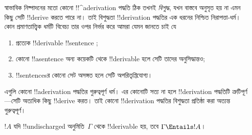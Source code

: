 \documentclass[../../../include/open-logic-section]{subfiles}
\begin{document}
      {}
      {}


\begin{explain}
স্বাভাবিক নিষ্পাদনের মতো কোনো !!^a{derivation} পদ্ধতি ঠিক তখনই
\emph{বিশুদ্ধ}, যখন বাস্তবে অনুসৃত হয় না এমন কিছু সেটি !!{derive}
করতে পারে না। তাই বিশুদ্ধতা !!{derivation} পদ্ধতির এক ধরনের নিশ্চিত
নিরাপত্তা-ধর্ম। কোন প্রমাণতাত্ত্বিক ধর্মটি বিবেচ্য তার ওপর নির্ভর করে
আমরা যেমন জানতে চাই যে
\begin{enumerate}
\item প্রত্যেক !!{derivable} !!{sentence} ;
\item কোনো !!a{sentence} অন্য কয়েকটি থেকে !!{derivable} হলে সেটি
  তাদের অনুসিদ্ধান্তও;
\item !!{sentence}sর কোনো সেট অসঙ্গত হলে সেটি অপরিতৃপ্তিযোগ্য।
\end{enumerate}
এগুলি কোনো !!a{derivation} পদ্ধতির গুরুত্বপূর্ণ ধর্ম। এর কোনোটি সত্য
না হলে !!{derivation} পদ্ধতিটি ত্রুটিপূর্ণ—সেটি অত্যধিক কিছু
!!{derive} করত। তাই কোনো !!{derivation} পদ্ধতির বিশুদ্ধতা প্রতিষ্ঠা
করা অত্যন্ত গুরুত্বপূর্ণ।
\end{explain}

\begin{thm}[বিশুদ্ধতা]
$!A$ যদি !!{undischarged} অনুমিতি~$\Gamma$ থেকে !!{derivable} হয়,
তবে $\Gamma \Entails !A$।
\end{thm}
\end{document}
